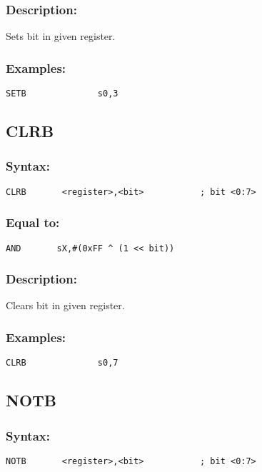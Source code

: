         \subsubsection{Description:}
            Sets bit in given register.

        \subsubsection{Examples:}
        {
            \usecodefont
            \verb'SETB              s0,3'\\
        }

    \subsection{CLRB}
        \subsubsection{Syntax:}
        {
            \usecodefont
            \verb'CLRB       <register>,<bit>           ; bit <0:7>'
        }

        \subsubsection{Equal to:}
        {
            \usecodefont
            \verb'AND       sX,#(0xFF ^ (1 << bit))'
        }

        \subsubsection{Description:}
            Clears bit in given register.

        \subsubsection{Examples:}
        {
            \usecodefont
            \verb'CLRB              s0,7'\\
        }

    \subsection{NOTB}
        \subsubsection{Syntax:}
        {
            \usecodefont
            \verb'NOTB       <register>,<bit>           ; bit <0:7>'
        }

